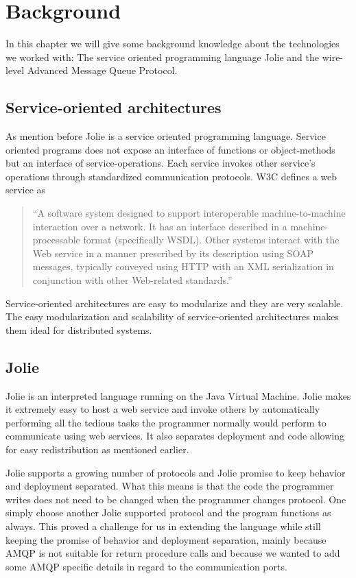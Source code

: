 \section{Background}
In this chapter we will give some background knowledge about the technologies we worked with: The service oriented programming language Jolie and the wire-level Advanced Message Queue Protocol.
\subsection{Service-oriented architectures}
As mention before Jolie is a service oriented programming language. Service oriented programs does not expose an interface of functions or object-methods but an interface of service-operations. Each service invokes other service's operations through standardized communication protocols. W3C defines a web service as

\blockquote{``A software system designed to support interoperable machine-to-machine interaction over a network. It has an interface described in a machine-processable format (specifically WSDL). Other systems interact with the Web service in a manner prescribed by its description using SOAP messages, typically conveyed using HTTP with an XML serialization in conjunction with other Web-related standards.''\cite[W3C, 2004]{W3COnWebServices}}

Service-oriented architectures are easy to modularize and they are very scalable. The easy modularization and scalability of service-oriented architectures makes them ideal for distributed systems.
\subsection{Jolie}
Jolie\cite[Jolie-lang.org]{Jolie} is an interpreted language running on the Java Virtual Machine. Jolie makes it extremely easy to host a web service and invoke others by automatically performing all the tedious tasks the programmer normally would perform to communicate using web services. It also separates deployment and code allowing for easy redistribution as mentioned earlier.

Jolie supports a growing number of protocols and Jolie promise to keep behavior and deployment separated. What this means is that the code the programmer writes does not need to be changed when the programmer changes protocol. One simply choose another Jolie supported protocol and the program functions as always. This proved a challenge for us in extending the language while still keeping the promise of behavior and deployment separation, mainly because AMQP is not suitable for return procedure calls and because we wanted to add some AMQP specific details in regard to the communication ports.
